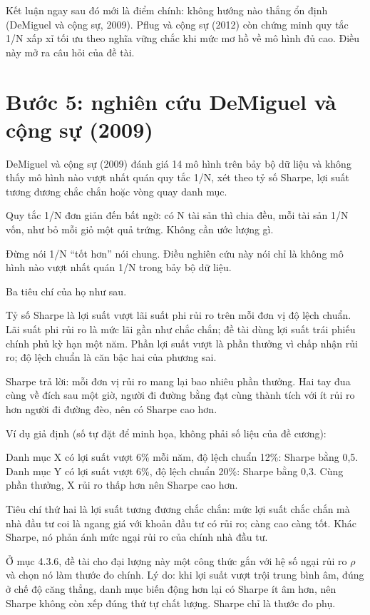 Kết luận ngay sau đó mới là điểm chính: không hướng nào thắng ổn định (DeMiguel và cộng sự, 2009). Pflug và cộng sự (2012) còn chứng minh quy tắc 1/N xấp xỉ tối ưu theo nghĩa vững chắc khi mức mơ hồ về mô hình đủ cao. Điều này mở ra câu hỏi của đề tài.

\section{Bước 5: nghiên cứu DeMiguel và cộng sự (2009)}

DeMiguel và cộng sự (2009) đánh giá 14 mô hình trên bảy bộ dữ liệu và không thấy mô hình nào vượt nhất quán quy tắc 1/N, xét theo tỷ số Sharpe, lợi suất tương đương chắc chắn hoặc vòng quay danh mục.

Quy tắc 1/N đơn giản đến bất ngờ: có N tài sản thì chia đều, mỗi tài sản 1/N vốn, như bỏ mỗi giỏ một quả trứng. Không cần ước lượng gì.

Đừng nói 1/N “tốt hơn” nói chung. Điều nghiên cứu này nói chỉ là không mô hình nào vượt nhất quán 1/N trong bảy bộ dữ liệu.

Ba tiêu chí của họ như sau.

Tỷ số Sharpe là lợi suất vượt lãi suất phi rủi ro trên mỗi đơn vị độ lệch chuẩn. Lãi suất phi rủi ro là mức lãi gần như chắc chắn; đề tài dùng lợi suất trái phiếu chính phủ kỳ hạn một năm. Phần lợi suất vượt là phần thưởng vì chấp nhận rủi ro; độ lệch chuẩn là căn bậc hai của phương sai.

Sharpe trả lời: mỗi đơn vị rủi ro mang lại bao nhiêu phần thưởng. Hai tay đua cùng về đích sau một giờ, người đi đường bằng đạt cùng thành tích với ít rủi ro hơn người đi đường đèo, nên có Sharpe cao hơn.

\begin{tcolorbox}[breakable]
Ví dụ giả định (số tự đặt để minh họa, không phải số liệu của đề cương):

Danh mục X có lợi suất vượt 6\% mỗi năm, độ lệch chuẩn 12\%: Sharpe bằng 0,5. Danh mục Y có lợi suất vượt 6\%, độ lệch chuẩn 20\%: Sharpe bằng 0,3. Cùng phần thưởng, X rủi ro thấp hơn nên Sharpe cao hơn.
\end{tcolorbox}

Tiêu chí thứ hai là lợi suất tương đương chắc chắn: mức lợi suất chắc chắn mà nhà đầu tư coi là ngang giá với khoản đầu tư có rủi ro; càng cao càng tốt. Khác Sharpe, nó phản ánh mức ngại rủi ro của chính nhà đầu tư.

Ở mục 4.3.6, đề tài cho đại lượng này một công thức gắn với hệ số ngại rủi ro $\rho$ và chọn nó làm thước đo chính. Lý do: khi lợi suất vượt trội trung bình âm, đúng ở chế độ căng thẳng, danh mục biến động hơn lại có Sharpe ít âm hơn, nên Sharpe không còn xếp đúng thứ tự chất lượng. Sharpe chỉ là thước đo phụ.

